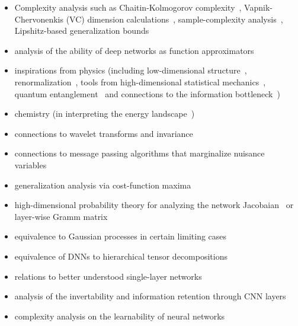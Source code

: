 \documentclass[11pt,lettersize]{article}
\begin{document}
\begin{itemize}
    \item Complexity analysis such as Chaitin-Kolmogorov complexity~\cite{pearlmutter1991chaitin}, Vapnik-Chervonenkis (VC) dimension calculations~\cite{bartlett1993lower,bartlett1993vapnik,vapnik1994measuring,bartlett1996vc,bartlett1999almost,bartlett2003vapnik}, sample-complexity analysis~\cite{bartlett1998sample}, Lipshitz-based generalization bounds~\cite{bartlett2017spectrally}
    \item analysis of the ability of deep networks as function approximators~\cite{hornik1991approximation,shaham2016provable,mhaskar2016deep,eldan2016power,long2018representing}
    \item inspirations from physics (including low-dimensional structure~\cite{lin2017does}, renormalization~\cite{mehta2014exact}, tools from high-dimensional statistical mechanics~\cite{poole2016exponential}, quantum entanglement~\cite{levine2017deep,levine2018bridging} and connections to the information bottleneck~\cite{tishby2015deep})
    \item chemistry (in interpreting the energy landscape~\cite{ballard2017energy})
    \item connections to wavelet transforms and invariance~\cite{mallat2016understanding,bruna2013invariant,wiatowski2016discrete}
    \item connections to message passing algorithms that marginalize nuisance variables~\cite{patel2016probabilistic}
    \item generalization analysis via cost-function maxima~\cite{mhaskar2018analysis}
    \item high-dimensional probability theory for analyzing the network Jacobaian~\cite{pennington2017resurrecting,pennington2018emergence} or layer-wise Gramm matrix~\cite{pennington2017nonlinear}
    \item equivalence to Gaussian processes in certain limiting cases~\cite{lee2017deep}
    \item equivalence of DNNs to hierarchical tensor decompositions~\cite{cohen2016convolutional,cohen2017analysis,stock2018learning}
    \item relations to better understood single-layer networks~\cite{veit2016residual,philipp2017gradients} 
    \item analysis of the invertability and information retention through CNN layers~\cite{arora2015deep,bahmani2017anchored}
    \item complexity analysis on the learnability of neural networks~\cite{song2017complexity} 

\end{itemize}
\end{document}

